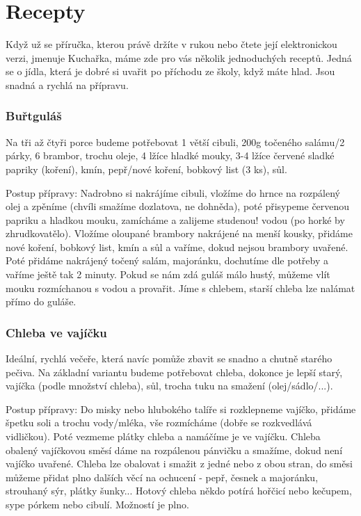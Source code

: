 \section{Recepty}
Když už se příručka, kterou právě držíte v rukou nebo čtete její elektronickou
verzi, jmenuje Kuchařka, máme zde pro vás několik jednoduchých receptů. Jedná se
o jídla, která je dobré si uvařit po příchodu ze školy, když máte hlad. Jsou
snadná a rychlá na přípravu.


\subsubsection*{Buřtguláš}
Na tři až čtyři porce budeme potřebovat 1 větší cibuli, 200g točeného salámu/2
párky, 6 brambor, trochu oleje, 4 lžíce hladké mouky, 3-4 lžíce červené sladké
papriky (koření), kmín, pepř/nové koření, bobkový list (3 ks), sůl.

Postup přípravy: Nadrobno si nakrájíme cibuli, vložíme do hrnce na rozpálený
olej a zpěníme (chvíli smažíme dozlatova, ne dohněda), poté přisypeme červenou
papriku a hladkou mouku, zamícháme a zalijeme studenou! vodou (po horké by
zhrudkovatělo). Vložíme oloupané brambory nakrájené na menší kousky, přidáme
nové koření, bobkový list, kmín a sůl a vaříme, dokud nejsou brambory uvařené.
Poté přidáme nakrájený točený salám, majoránku, dochutíme dle potřeby a vaříme
ještě tak 2 minuty. Pokud se nám zdá guláš málo hustý, můžeme vlít mouku
rozmíchanou s vodou a provařit. Jíme s chlebem, starší chleba lze nalámat přímo
do guláše.


\subsubsection*{Chleba ve vajíčku}
Ideální, rychlá večeře, která navíc pomůže zbavit se snadno a chutně starého
pečiva. Na základní variantu budeme potřebovat chleba, dokonce je lepší starý,
vajíčka (podle množství chleba), sůl, trocha tuku na smažení (olej/sádlo/...).

Postup přípravy: Do misky nebo hlubokého talíře si rozklepneme vajíčko, přidáme
špetku soli a trochu vody/mléka, vše rozmícháme (dobře se rozkvedlává
vidličkou). Poté vezmeme plátky chleba a namáčíme je ve vajíčku. Chleba obalený
vajíčkovou směsí dáme na rozpálenou pánvičku a smažíme, dokud není vajíčko
uvařené. Chleba lze obalovat i smažit z jedné nebo z obou stran, do směsi můžeme
přidat plno dalších věcí na ochucení - pepř, česnek a majoránku, strouhaný sýr,
plátky šunky... Hotový chleba někdo potírá hořčicí nebo kečupem, sype pórkem
nebo cibulí. Možností je plno.


